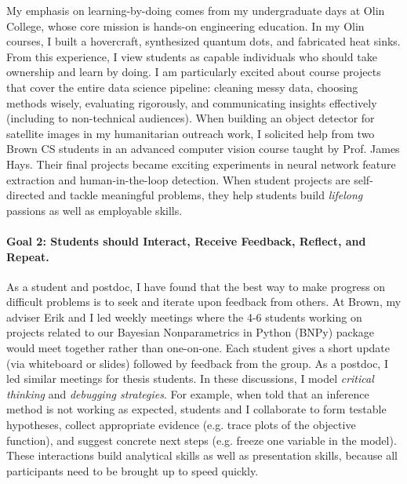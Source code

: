 \documentclass[11pt,letterpaper]{article}
\begin{document}
My emphasis on learning-by-doing comes from my undergraduate days at Olin College, whose core mission is hands-on engineering education. In my Olin courses, I built a hovercraft, synthesized quantum dots, and fabricated heat sinks. From this experience, I view students as capable individuals who should take ownership and learn by doing.
I am particularly excited about course projects that cover the entire data science pipeline: 
cleaning messy data,
choosing methods wisely,
evaluating rigorously,
and communicating insights effectively (including to non-technical audiences).
When building an object detector for satellite images in my humanitarian outreach work, I solicited help from two Brown CS students in an advanced computer vision course taught by Prof. James Hays.
Their final projects became exciting experiments in neural network feature extraction and human-in-the-loop detection.
When student projects are self-directed and tackle meaningful problems, they help students build \emph{lifelong} passions as well as employable skills. 


\paragraph{Goal 2: Students should Interact, Receive Feedback, Reflect, and Repeat.}
As a student and postdoc, I have found that the best way to make progress on difficult problems is to seek and iterate upon feedback from others. At Brown, my adviser Erik and I led weekly meetings where the 4-6 students working on projects related to our Bayesian Nonparametrics in Python (BNPy) package would meet together rather than one-on-one. Each student gives a short update (via whiteboard or slides) followed by feedback from the group. 
As a postdoc, I led similar meetings for thesis students.
In these discussions, I model \emph{critical thinking} and \emph{debugging strategies}.
For example, when told that an inference method is not working as expected, students and I collaborate to form testable hypotheses, collect appropriate evidence (e.g. trace plots of the objective function), and suggest concrete next steps (e.g. freeze one variable in the model).
These interactions build analytical skills as well as presentation skills, because all participants need to be brought up to speed quickly.
\end{document}
